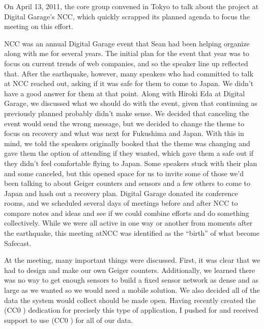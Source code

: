 On April 13, 2011, the core group convened in Tokyo to talk about the project at Digital Garage's \ac{NCC}, which quickly scrapped its planned agenda to focus the meeting on this effort. 

NCC was an annual Digital Garage event that Sean had been helping organize along with me for several years. The initial plan for the event that year was to focus on current trends of web companies, and so the speaker line up reflected that. After the earthquake, however, many speakers who had committed to talk at \ac{NCC} reached out, asking if it was safe for them to come to Japan. We didn't have a good answer for them at that point. Along with Hiroki Eda at Digital Garage, we discussed what we should do with the event, given that continuing as previously planned probably didn't make sense. We decided that canceling the event would send the wrong message, but we decided to change the theme to focus on recovery and what was next for Fukushima and Japan. With this in mind, we told the speakers originally booked that the theme was changing and gave them the option of attending if they wanted, which gave them a safe out if they didn't feel comfortable flying to Japan. Some speakers stuck with their plan and some canceled, but this opened space for us to invite some of those we'd been talking to about Geiger counters and sensors and a few others to come to Japan and hash out a recovery plan. Digital Garage donated its conference rooms, and we scheduled several days of meetings before and after \ac{NCC} to compare notes and ideas and see if we could combine efforts and do something collectively. While we were all active in one way or another from moments after the earthquake, this meeting at\ac{NCC} was identified as the ``birth'' of what become Safecast.

At the meeting, many important things were discussed. First, it was clear that we had to design and make our own Geiger counters. Additionally, we learned there was no way to get enough sensors to build a fixed sensor network as dense and as large as we wanted so we would need a mobile solution. We also decided all of the data the system would collect should be made open. Having recently created the (CC0 \ccZero) dedication for precisely this type of application, I pushed for and received support to use (CC0 \ccZero) for all of our data.

